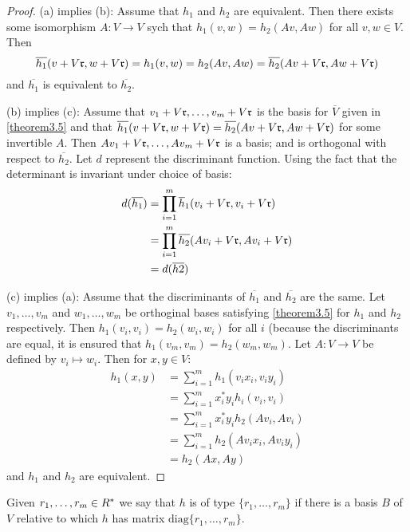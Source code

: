 \begin{proof}
(a) implies (b): Assume that $h_1$ and $h_2$ are equivalent.
Then there exists some isomorphism $A: V \to V$ sych that $h_1(v,w) = h_2(Av, Aw)$ for all $v, w \in V$.
Then
\[
\overline{h_1}(v + V \mathfrak{r}, w + V \mathfrak{r}) = h_1(v, w) = h_2(Av, Aw) = \overline{h_2}(Av + V \mathfrak{r}, Aw + V \mathfrak{r})
\]
and $\overline{h_1}$ is equivalent to $\overline{h_2}$.

(b) implies (c): Assume that $v_1 + V \mathfrak{r}, \dotsc, v_m + V \mathfrak{r}$ is the basis for $\overline{V}$ given in \cref{theorem3.5} and that $\overline{h_1}(v + V\mathfrak{r}, w + V \mathfrak{r}) = \overline{h_2}(Av + V \mathfrak{r}, Aw + V \mathfrak{r})$ for some invertible $A$.
Then $A v_1 + V \mathfrak{r}, \dotsc, A v_m + V \mathfrak{r}$ is a basis; and is orthogonal with respect to $\overline{h_2}$.
Let $d$ represent the discriminant function.
Using the fact that the determinant is invariant under choice of basis:
\begin{align*}
d(\overline{h_1}) &= \prod_{i=1}^m \overline{h}_1(v_i + V \mathfrak{r}, v_i + V \mathfrak{r})\\
&= \prod_{i=1}^m \overline{h_2}(Av_i + V \mathfrak{r}, Av_i + V \mathfrak{r})\\ &
= d(\overline{h2})
\end{align*}

(c) implies (a): Assume that the discriminants of $\overline{h_1}$ and $\overline{h_2}$ are the same.
Let $v_1, \dotsc, v_m$ and $w_1, \dotsc, w_m$ be orthoginal bases satisfying \cref{theorem3.5} for $h_1$ and $h_2$ respectively.
Then $h_1(v_i, v_i) = h_2(w_i, w_i)$ for all $i$ (because the discriminants are equal, it is ensured that $h_1(v_m,v_m) = h_2(w_m, w_m)$.
Let $A: V \to V$ be defined by $v_i \mapsto w_i$.
Then for $x, y \in V$:
\begin{align*}
h_1(x, y) &= \sum_{i=1}^m h_1(v_i x_i, v_i y_i) \\
&= \sum_{i=1}^m x_i^* y_i h_i(v_i, v_i) \\
&= \sum_{i=1}^m x_i^*y_i h_2(Av_i, Av_i)\\
&= \sum_{i=1}^m h_2(Av_i x_i, A v_i y_i)\\
&= h_2(Ax, Ay)
\end{align*}
and $h_1$ and $h_2$ are equivalent.

\end{proof}

Given $r_1, \dotsc, r_m \in R^*$ we say that $h$ is of type $\{r_1, \dotsc, r_m \}$ if there is a basis $B$ of $V$ relative to which $h$ has matrix $\text{diag} \{r_1, \dotsc, r_m \}$.

